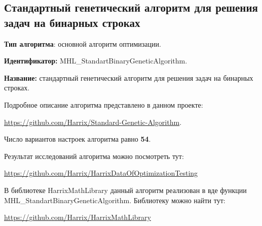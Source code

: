 \subsection{Стандартный генетический алгоритм для решения задач на бинарных строках}\label{HarrixOptimizationAlgorithms:MHL_StandartBinaryGeneticAlgorithm}

\textbf{Тип алгоритма}: основной алгоритм оптимизации.

\textbf{Идентификатор:} MHL\_StandartBinaryGeneticAlgorithm.

\textbf{Название:} стандартный генетический алгоритм для решения задач на бинарных строках.

Подробное описание алгоритма представлено в данном проекте: 

\href{https://github.com/Harrix/Standard-Genetic-Algorithm}{https://github.com/Harrix/Standard-Genetic-Algorithm}.

Число вариантов настроек алгоритма равно \textbf{54}.

Результат исследований алгоритма можно посмотреть тут:

\href{https://github.com/Harrix/HarrixDataOfOptimizationTesting}{https://github.com/Harrix/HarrixDataOfOptimizationTesting}

В библиотеке HarrixMathLibrary данный алгоритм реализован в вде функции MHL\_StandartBinaryGeneticAlgorithm. Библиотеку можно найти тут:

\href{https://github.com/Harrix/HarrixMathLibrary}{https://github.com/Harrix/HarrixMathLibrary}